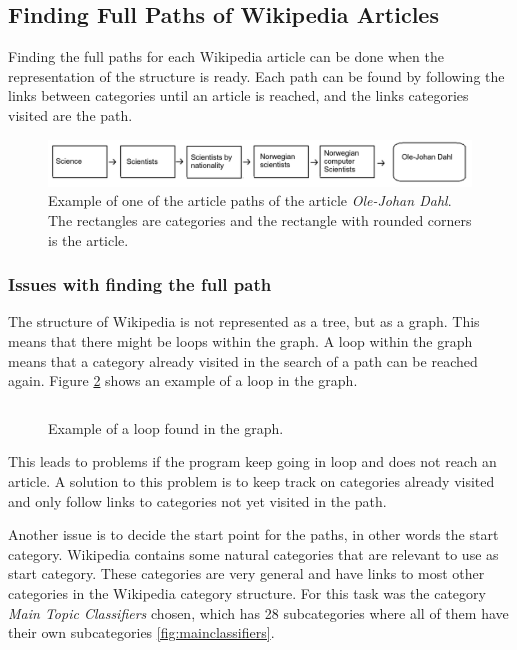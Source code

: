 \subsection{Finding Full Paths of Wikipedia Articles}
Finding the full paths for each Wikipedia article can be done when the representation of the structure is ready. Each path can be found by following the links between categories until an article is reached, and the links categories visited are the path. 

\begin{figure}[h]
\centering
\includegraphics[width=\textwidth]{Chapters/Implementation/example_path}
\caption[Example of an article path]{Example of one of the article paths of the article \emph{Ole-Johan Dahl}. The rectangles are categories and the rectangle with rounded corners is the article. }
\label{fig:examplepath}
\end{figure}

\subsubsection{Issues with finding the full path}
The structure of Wikipedia is not represented as a tree, but as a graph. This means that there might be loops within the graph. A loop within the graph means that a category already visited in the search of a path can be reached again. Figure \ref{fig:exampleloop} shows an example of a loop in the graph. 

\begin{figure}
\centering
\begin{lstlisting}
\end{lstlisting}
\caption{Example of a loop found in the graph.}
\label{fig:exampleloop}
\end{figure}


This leads to problems if the program keep going in loop and does not reach an article. A solution to this problem is to keep track on categories already visited and only follow links to categories not yet visited in the path. 

Another issue is to decide the start point for the paths, in other words the start category. Wikipedia contains some natural categories that are relevant to use as start category. These categories are very general and have links to most other categories in the Wikipedia category structure. For this task was the category \emph{Main Topic Classifiers} chosen, which has 28 subcategories where all of them have their own subcategories \ref{fig:mainclassifiers}\cite{wiki:specialtree}.

